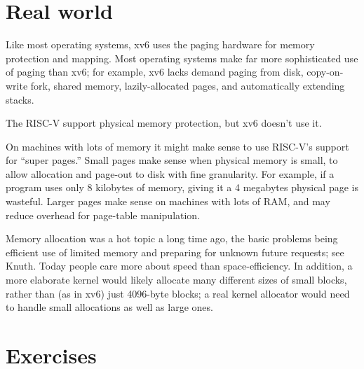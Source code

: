 \section{Real world}

Like most operating systems, xv6 uses the paging hardware
for memory protection and mapping.
Most operating systems make far more sophisticated
use of paging than xv6; for example, xv6 lacks demand
paging from disk, copy-on-write fork, shared memory,
lazily-allocated pages,
and automatically extending stacks.

The RISC-V support physical memory protection, but xv6 doesn't use it.

On machines with lots of memory
it might make sense to use
RISC-V's support for ``super pages.''
Small pages make sense
when physical memory is small, to allow allocation and page-out to disk
with fine granularity.
For example, if a program
uses only 8 kilobytes of memory, giving it a 4 megabytes physical page is wasteful.
Larger pages make sense on machines with lots of RAM,
and may reduce overhead for page-table manipulation.

Memory allocation was a hot topic a long time ago, the basic problems being
efficient use of limited memory and
preparing for unknown future requests;
see Knuth.  Today people care more about speed than
space-efficiency.  In addition, a more elaborate kernel
would likely allocate many different sizes of small blocks,
rather than (as in xv6) just 4096-byte blocks;
a real kernel
allocator would need to handle small allocations as well as large
ones.
\section{Exercises}

